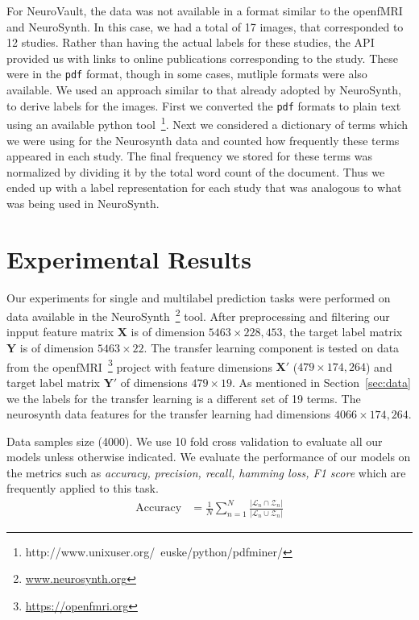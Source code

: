 \documentclass{article} %
\begin{document}
For NeuroVault, the data was not available in a format similar to the openfMRI and NeuroSynth. In this case, we had a total of 17 images, that corresponded to 12 studies. Rather than having the actual labels for these studies, the API provided us with links to online publications corresponding to the study. These were in the \texttt{pdf} format, though in some cases, mutliple formats were also available. We used an approach similar to that already adopted by NeuroSynth, to derive labels for the images. First we converted the \texttt{pdf} formats to plain text using an available python tool~\footnote{http://www.unixuser.org/~euske/python/pdfminer/}. Next we considered a dictionary of terms which we were using for the Neurosynth data and counted how frequently these terms appeared in each study. The final frequency we stored for these terms was normalized by dividing it by the total word count of the document. Thus we ended up with a label representation for each study that was analogous to what was being used in NeuroSynth.

\section{Experimental Results}

Our experiments for single and multilabel prediction tasks were performed on data available in the NeuroSynth~\footnote{\protect \url{www.neurosynth.org}} tool. After preprocessing and filtering our inpput feature matrix  $\mathbf{X}$ is of dimension $5463 \times 228,453$, the target label matrix $\mathbf{Y}$ is of dimension $5463 \times 22$. The transfer learning component is tested on data from the openfMRI~\footnote{\protect \url{https://openfmri.org}} project with feature dimensions $\mathbf{X}'$ ($479 \times 174,264$) and target label matrix $\mathbf{Y}'$ of dimensions $479 \times 19$. As mentioned in Section~\ref{sec:data} we the labels for the transfer learning is a different set of 19 terms. The neurosynth data features for the transfer learning had dimensions $4066 \times 174,264$.

Data samples size (4000). We use 10 fold cross validation to evaluate all our models unless otherwise indicated. We evaluate the performance of our models on the metrics such as \textit{accuracy, precision, recall, hamming loss, F1 score} which are frequently applied to this task.
\begin{align*}
 \text{Accuracy} &= \frac{1}{N} \displaystyle\sum_{n=1}^{N} \frac{|\mathcal{L}_n \cap \mathcal{Z}_n|}{|\mathcal{L}_n \cup \mathcal{Z}_n|} 
\end{align*}
\end{document}
